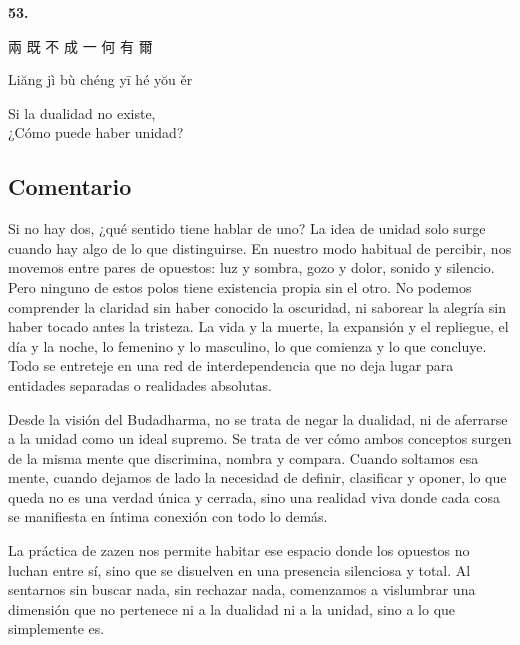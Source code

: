 \documentclass[
  a5paperpaper,
]{article}
\begin{document}
\hfill\break

\hypertarget{03}{}
\begin{verseblock}

\newpage

\begin{center}\textbf{53.}\end{center}

兩 既 不 成 一 何 有 爾

Liăng jì bù chéng yī hé yŏu ěr

Si la dualidad no existe,\\
¿Cómo puede haber unidad?

\end{verseblock}

\hfill\break

\hypertarget{comentario-52}{%
\subsection{Comentario}\label{comentario-52}}

Si no hay dos, ¿qué sentido tiene hablar de uno? La idea de unidad solo
surge cuando hay algo de lo que distinguirse. En nuestro modo habitual
de percibir, nos movemos entre pares de opuestos: luz y sombra, gozo y
dolor, sonido y silencio. Pero ninguno de estos polos tiene existencia
propia sin el otro. No podemos comprender la claridad sin haber conocido
la oscuridad, ni saborear la alegría sin haber tocado antes la tristeza.
La vida y la muerte, la expansión y el repliegue, el día y la noche, lo
femenino y lo masculino, lo que comienza y lo que concluye. Todo se
entreteje en una red de interdependencia que no deja lugar para
entidades separadas o realidades absolutas.

Desde la visión del Budadharma, no se trata de negar la dualidad, ni de
aferrarse a la unidad como un ideal supremo. Se trata de ver cómo ambos
conceptos surgen de la misma mente que discrimina, nombra y compara.
Cuando soltamos esa mente, cuando dejamos de lado la necesidad de
definir, clasificar y oponer, lo que queda no es una verdad única y
cerrada, sino una realidad viva donde cada cosa se manifiesta en íntima
conexión con todo lo demás.

La práctica de zazen nos permite habitar ese espacio donde los opuestos
no luchan entre sí, sino que se disuelven en una presencia silenciosa y
total. Al sentarnos sin buscar nada, sin rechazar nada, comenzamos a
vislumbrar una dimensión que no pertenece ni a la dualidad ni a la
unidad, sino a lo que simplemente es.
\end{document}
